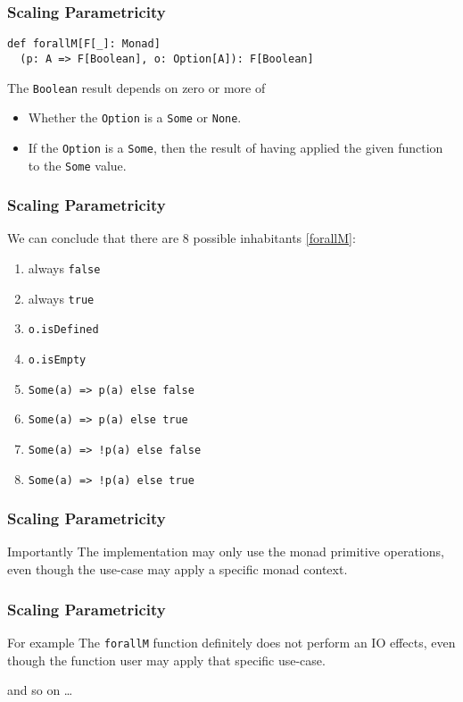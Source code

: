 \begin{frame}[fragile]
\frametitle{Scaling Parametricity}
\begin{lstlisting}[style=scala]
def forallM[F[_]: Monad]
  (p: A => F[Boolean], o: Option[A]): F[Boolean]
\end{lstlisting}
\begin{theorem}
  The \lstinline{Boolean} result depends on zero or more of
  \begin{itemize}
    \item Whether the \lstinline{Option} is a \lstinline{Some} or \lstinline{None}.
    \item If the \lstinline{Option} is a \lstinline{Some}, then the result of having applied the given function to the \lstinline{Some} value.
  \end{itemize}
\end{theorem}
\end{frame}

\begin{frame}[fragile]
\frametitle{Scaling Parametricity}
  We can conclude that there are 8 possible inhabitants \ref{forallM}:
  \begin{enumerate}
    \item always \lstinline{false}
    \item always \lstinline{true}
    \item \lstinline{o.isDefined}
    \item \lstinline{o.isEmpty}
    \item \lstinline{Some(a) => p(a) else false}
    \item \lstinline{Some(a) => p(a) else true}
    \item \lstinline{Some(a) => !p(a) else false}
    \item \lstinline{Some(a) => !p(a) else true}
  \end{enumerate}
\end{frame}

\begin{frame}[fragile]
\frametitle{Scaling Parametricity}
  \begin{block}{Importantly}
  The implementation may only use the monad primitive operations, even though the use-case may apply a specific monad context.
  \end{block}
\end{frame}

\begin{frame}[fragile]
\frametitle{Scaling Parametricity}
  \begin{block}{For example}
  The \lstinline{forallM} function definitely does not perform an IO effects, even though the function user may apply that specific use-case.
  \end{block}
  and so on \ldots
\end{frame}
